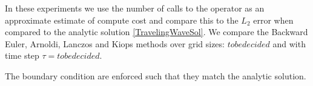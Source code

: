 In these experiments we use the number of calls to the operator as an approximate estimate of compute cost and compare this to the $L_2$ error when compared to the analytic solution \eqref{TravelingWaveSol}.
We compare the Backward Euler, Arnoldi, Lanczos and Kiops methods over grid sizes: $to be decided$ and with time step $\tau=tobedecided$.


The boundary condition are enforced such that they match the analytic solution.

